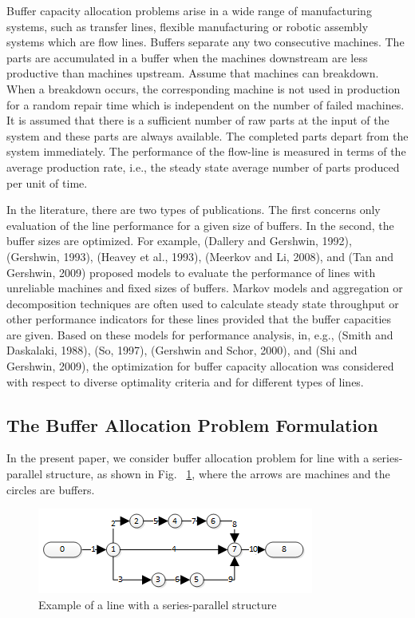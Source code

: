 \documentclass{ifacconf}
\begin{document}
Buffer  capacity  allocation  problems  arise  in  a  wide  range  of  manufacturing  systems, 
such  as  transfer  lines,  flexible  manufacturing  or  robotic  assembly  systems  which  are 
flow lines. Buffers separate any two consecutive machines. The parts are accumulated in
a buffer when the machines downstream are less productive than machines upstream. 
Assume that machines can breakdown. When a breakdown occurs, the corresponding 
machine is not used in production for a random repair time which is independent on the 
number of failed machines. It is assumed that there is a sufficient number of raw parts at 
the input of the system and these parts are always available. The completed parts depart 
from the system immediately. The performance of the flow-line is measured in terms of 
the average production rate, i.e., the steady state average number of parts produced per 
unit of time.

In the literature, there are two types of publications. The first concerns only evaluation 
of the line performance for a given size of buffers. In the second, the buffer sizes are 
optimized. For example, (Dallery and Gershwin, 1992), (Gershwin, 1993), (Heavey et 
al., 1993), (Meerkov and Li, 2008), and (Tan and Gershwin, 2009) proposed models to 
evaluate the performance of lines with unreliable machines and fixed sizes of buffers. 
Markov models and aggregation or decomposition techniques are often used to calculate 
steady state throughput or other performance indicators for these lines provided that the 
buffer  capacities  are  given.  Based  on  these  models  for  performance  analysis,  in,  e.g., 
(Smith  and  Daskalaki,  1988),  (So,  1997),  (Gershwin  and  Schor,  2000),  and  (Shi  and 
Gershwin,  2009),  the  optimization  for  buffer  capacity  allocation  was  considered  with 
respect to diverse optimality criteria and for different types of lines.

\subsection{The Buffer Allocation Problem Formulation} \label{bap_formulation}

In the present paper, we consider buffer allocation problem for line with a series-parallel structure, as shown in Fig. ~\ref{lineexample}, where the arrows are machines and the circles are buffers.

 \begin{figure}[h!]
	\centering
	\includegraphics[scale=0.9]{LineSchems}
  \caption{Example of a line with a series-parallel structure\label{lineexample}}
  \end{figure}
\end{document}
